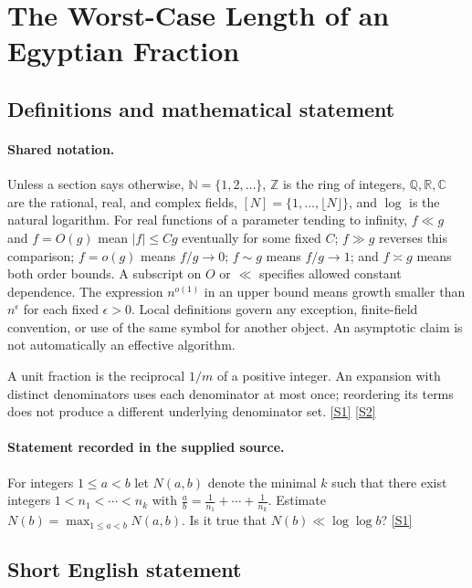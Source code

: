 \documentclass[11pt,a4paper]{article}
\newcommand{\N}{\mathbb{N}}
\newcommand{\Z}{\mathbb{Z}}
\newcommand{\Q}{\mathbb{Q}}
\newcommand{\R}{\mathbb{R}}
\newcommand{\C}{\mathbb{C}}
\newcommand{\sref}[2]{\hyperlink{source:#1:#2}{[S#2]}}
\begin{document}
\section{The Worst-Case Length of an Egyptian Fraction}\label{statement}


\subsection{Definitions and mathematical statement}

\paragraph{Shared notation.}Unless a section says otherwise, $\N=\{1,2,\ldots\}$,
$\Z$ is the ring of integers, $\Q,\R,\C$ are the rational, real, and complex
fields, $[N]=\{1,\ldots,\lfloor N\rfloor\}$, and $\log$ is the natural
logarithm. For real functions of a parameter tending to infinity,
$f\ll g$ and $f=O(g)$ mean $|f|\leq Cg$ eventually for some fixed $C$;
$f\gg g$ reverses this comparison; $f=o(g)$ means $f/g\to0$;
$f\sim g$ means $f/g\to1$; and $f\asymp g$ means both order bounds.
A subscript on $O$ or $\ll$ specifies allowed constant dependence.
The expression $n^{o(1)}$ in an upper bound means growth smaller than
$n^\epsilon$ for each fixed $\epsilon>0$. Local definitions govern any
exception, finite-field convention, or use of the same symbol for another
object. An asymptotic claim is not automatically an effective algorithm.



A unit fraction is the reciprocal $1/m$ of a positive integer. An expansion with distinct denominators uses each denominator at most once; reordering its terms does not produce a different underlying denominator set. \sref{statement}{1} \sref{statement}{2}

\paragraph{Statement recorded in the supplied source.}
For integers $1\leq a<b$ let $N(a,b)$ denote the minimal $k$ such that there exist integers $1<n_1<\cdots<n_k$ with $ \frac{a}{b}=\frac{1}{n_1}+\cdots+\frac{1}{n_k}. $ Estimate $N(b)=\max_{1\leq a<b}N(a,b)$. Is it true that $N(b) \ll \log\log b$? \sref{statement}{1}

\subsection{Short English statement}
\end{document}
